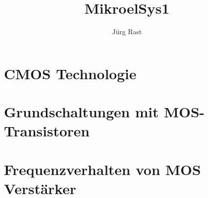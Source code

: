 \documentclass[titlepage=true]{scrartcl}
\title{MikroelSys1}
\author{Jürg Rast}
\begin{document}

\tableofcontents
\newpage

\section{CMOS Technologie}





\section{Grundschaltungen mit MOS-Transistoren}









\section{Frequenzverhalten von MOS Verstärker}





%

\end{document}
